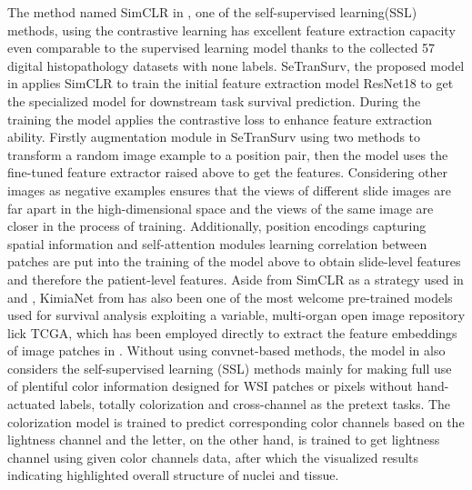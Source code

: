 \documentclass[journal,twoside,web]{ieeecolor}
\begin{document}
The method named SimCLR in \cite{ciga2022self}, one of the self-supervised learning(SSL) methods, using the contrastive learning has excellent feature extraction capacity even comparable to the supervised learning model thanks to the collected 57 digital histopathology datasets with none labels.
SeTranSurv, the proposed model in \cite{huang2021integration} applies SimCLR to train the initial feature extraction model ResNet18\cite{he2016deep} to get the specialized model for downstream task survival prediction.
During the training the model applies the contrastive loss\cite{he2020momentum} to enhance feature extraction ability.
Firstly augmentation module in SeTranSurv using two methods to transform a random image example to a position pair, then the model uses the fine-tuned feature extractor raised above to get the features. 
Considering other images as negative examples ensures that the views of different slide images are far apart in the high-dimensional space and the views of the same image are closer in the process of training.
Additionally, position encodings capturing spatial information and self-attention modules learning correlation between patches are put into the training of the model above to obtain slide-level features and therefore the patient-level features.
Aside from SimCLR as a strategy used in \cite{benkirane2022hyper} and \cite{li2021dual}, KimiaNet from \cite{riasatian2021fine} has also been one of the most welcome pre-trained models used for survival analysis exploiting a variable, multi-organ open image repository lick TCGA, which has been employed directly to extract the feature embeddings of image patches in \cite{guo2023higt} \cite{li2021dual}.
Without using convnet-based methods, the model in \cite{fan2022cancer} also considers the self-supervised learning (SSL) methods mainly for making full use of plentiful color information designed for WSI patches or pixels without hand-actuated labels, totally colorization and cross-channel as the pretext tasks.
The colorization model is trained to predict corresponding color channels based on the lightness channel and the letter, on the other hand, is trained to get lightness channel using given color channels data, after which the visualized results indicating highlighted overall structure of nuclei and tissue.
\end{document}
